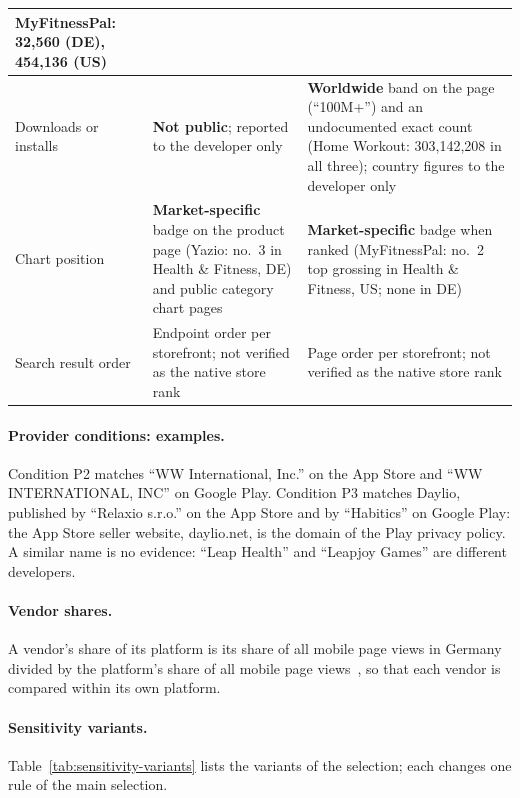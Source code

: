 \begin{table}[H]
\begin{singlespace}
\begin{tabularx}{\textwidth}{@{}>{\raggedright\arraybackslash}p{2.3cm}>{\raggedright\arraybackslash}X>{\raggedright\arraybackslash}X@{}}
  MyFitnessPal: 32{,}560 (DE), 454{,}136 (US) \\
\midrule
Downloads or installs & \textbf{Not public}; reported to the developer
  only~\parencite{apple2026acquisition}
  & \textbf{Worldwide} band on the page (\enquote{100M+}) and an
  undocumented exact count (Home Workout: 303{,}142{,}208 in all three);
  country figures to the developer only~\parencite{google2026playstatistics} \\
\midrule
Chart position & \textbf{Market-specific} badge on the product page (Yazio:
  no.~3 in Health \& Fitness, DE) and public category chart pages
  & \textbf{Market-specific} badge when ranked (MyFitnessPal: no.~2 top
  grossing in Health \& Fitness, US; none in DE) \\
\midrule
Search result order & Endpoint order per storefront; not verified as the
  native store rank
  & Page order per storefront; not verified as the native store rank \\
\bottomrule
\end{tabularx}
\end{singlespace}
\end{table}


\paragraph{Provider conditions: examples.} Condition P2 matches \enquote{WW International,
Inc.} on the App Store and \enquote{WW INTERNATIONAL, INC} on Google Play. Condition P3 matches
Daylio, published by \enquote{Relaxio s.r.o.} on the App Store and by \enquote{Habitics} on
Google Play: the App Store seller website, daylio.net, is the domain of the Play privacy policy.
A similar name is no evidence: \enquote{Leap Health} and \enquote{Leapjoy Games} are different
developers.

\paragraph{Vendor shares.} A vendor's share of its platform is its share of all mobile page
views in Germany~\parencite{statcounter2026vendor} divided by the platform's share of all mobile
page views~\parencite{statcounter2026os}, so that each vendor is compared within its own
platform.

\paragraph{Sensitivity variants.} Table~\ref{tab:sensitivity-variants} lists the variants of
the selection; each changes one rule of the main selection.


